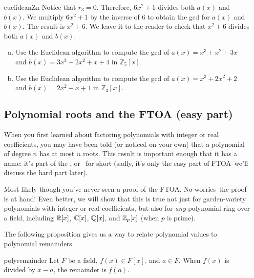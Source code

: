 \begin{example}{euclideanZn}
Notice that $r_3=0$. Therefore, $6x^2 + 1$ divides both $a(x)$ and $b(x)$. We multiply $6x^2 + 1$ by the inverse of 6 to obtain the gcd for $a(x)$ and $b(x)$. The result is $x^2+6$. We leave it to the reader to check that $x^2+6$ divides both $a(x)$ and $b(x)$.
\end{example}

\begin{exercise}{}
\begin{enumerate}[(a)]
\item
Use the Euclidean algorithm to compute the gcd of $a(x)=x^3+x^2+3x$ and  $b(x)=3x^3+2x^2+x+4$ in $\mathbb{Z}_5[x]$.
\item
Use the Euclidean algorithm to compute the gcd of $a(x)=x^3+2x^2+2$ and  $b(x)=2x^2-x+1$ in $\mathbb{Z}_3[x]$. 
\end{enumerate}
\end{exercise}

\subsection{Polynomial roots and the FTOA (easy part) \quad                                      
{}}\label{FTOA}
When you first learned about factoring polynomials with integer or real coefficients, you may have been told (or  noticed on your own) that a polynomial of degree $n$ has at most $n$ roots. This result is important enough that it has a name: it's part of the , or \ for short (sadly, it's only the easy part of FTOA--we'll discuss the hard part later). 

 Most likely though you've never seen a proof of the FTOA. No worries--the proof is at hand!   Even better, we will show that this is true not just for garden-variety polynomials with integer or real coefficients, but also for   \emph{any} polynomial ring over a field, including $\mathbb{R}[x]$, $\mathbb{C}[x]$, $\mathbb{Q}[x]$, and $\mathbb{Z}_p[x]$ (when $p$ is prime).  


The following proposition gives us a way to relate polynomial values to polynomial remainders.

\begin{prop}{polyremainder}
Let $F$ be a field, $f(x) \in F[x]$, and $a \in F$. When $f(x)$ is divided by $x-a$, the remainder is $f(a)$.
\end {prop}

